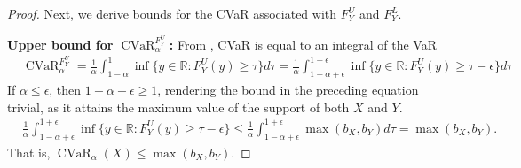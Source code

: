 \documentclass[acmlarge, manuscript, screen, review, natbib=false, oneside]{acmart}
\DeclareMathOperator{\CVaR}{CVaR}
\begin{document}
\begin{proof}
	Next, we derive bounds for the CVaR associated with $F_Y^U$ and $F_Y^L$.
	
	\textbf{Upper bound for $\CVaR_\alpha^{F_Y^U}$:} From \cite{acerbi2002coherence}, CVaR is equal to an integral of the VaR
	\begin{equation}
		\begin{aligned}
			&\CVaR_\alpha^{F_Y^U}=\frac{1}{\alpha}\int_{1-\alpha}^1 \inf \{y\in \mathbb{R}:F_Y^U(y)\geq \tau\} d\tau 
			=\frac{1}{\alpha}\int_{1-\alpha+\epsilon}^{1+\epsilon} \inf \{y\in \mathbb{R}:F_Y^U(y)\geq \tau -\epsilon\} d\tau
		\end{aligned}
	\end{equation}  
	If $\alpha \leq \epsilon$, then $1 - \alpha + \epsilon \geq 1$, rendering the bound in the preceding equation trivial, as it attains the maximum value of the support of both $X$ and $Y$.
	\begin{equation}\label{eq:helper1}
		\begin{aligned}
			&\frac{1}{\alpha}\int_{1-\alpha+\epsilon}^{1+\epsilon} \inf \{y\in \mathbb{R}:F_Y^U(y)\geq \tau -\epsilon\} 
			\leq \frac{1}{\alpha}\int_{1-\alpha+\epsilon}^{1+\epsilon} \max(b_X, b_Y)d\tau = \max(b_X, b_Y).
		\end{aligned}
	\end{equation}
	That is, $\CVaR_\alpha(X)\leq \max(b_X, b_Y)$.
	

\end{proof}
\end{document}

